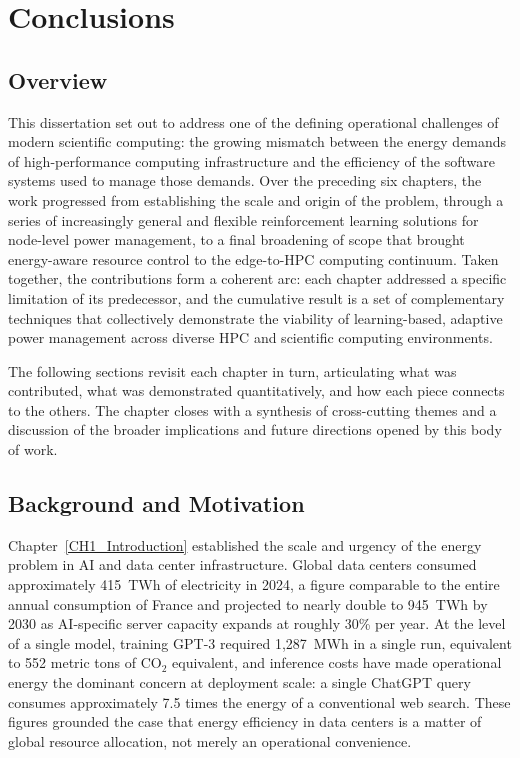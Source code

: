 
\chapter{Conclusions} \label{CH7_Conclusions}

\section{Overview}

This dissertation set out to address one of the defining operational challenges of
modern scientific computing: the growing mismatch between the energy demands of
high-performance computing infrastructure and the efficiency of the software systems
used to manage those demands.
Over the preceding six chapters, the work progressed from establishing the scale and
origin of the problem, through a series of increasingly general and flexible
reinforcement learning solutions for node-level power management, to a final broadening
of scope that brought energy-aware resource control to the edge-to-HPC computing
continuum.
Taken together, the contributions form a coherent arc: each chapter addressed a
specific limitation of its predecessor, and the cumulative result is a set of
complementary techniques that collectively demonstrate the viability of
learning-based, adaptive power management across diverse HPC and scientific computing
environments.

The following sections revisit each chapter in turn, articulating what was contributed,
what was demonstrated quantitatively, and how each piece connects to the others.
The chapter closes with a synthesis of cross-cutting themes and a discussion of the
broader implications and future directions opened by this body of work.

\section{Background and Motivation}

Chapter~\ref{CH1_Introduction} established the scale and urgency of the energy problem
in AI and data center infrastructure.
Global data centers consumed approximately 415~TWh of electricity in 2024, a figure
comparable to the entire annual consumption of France and projected to nearly double to
945~TWh by 2030 as AI-specific server capacity expands at roughly 30\% per year.
At the level of a single model, training GPT-3 required 1,287~MWh in a single run,
equivalent to 552 metric tons of CO$_2$ equivalent, and inference costs have made
operational energy the dominant concern at deployment scale: a single ChatGPT query
consumes approximately 7.5 times the energy of a conventional web search.
These figures grounded the case that energy efficiency in data centers is a matter of
global resource allocation, not merely an operational convenience.

